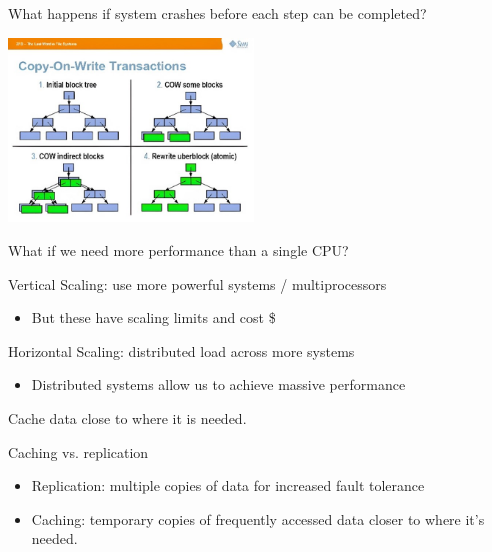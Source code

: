 \begin{slide}

    
    What happens if system crashes before each step can be completed?
    \bigskip

    \includegraphics[width=65mm]{zfs.jpg}

\end{slide}

\begin{slide}

	
	What if we need more performance than a single CPU?
	\bigskip
	
	Vertical Scaling: use more powerful systems / multiprocessors
	\begin{itemize}
		\item But these have scaling limits and cost \$
	\end{itemize}
	\bigskip
	
	Horizontal Scaling: distributed load across more systems
	\begin{itemize}
		\item Distributed systems allow us to achieve massive performance
	\end{itemize}

\end{slide}

\begin{slide}
	
	
	Cache data close to where it is needed.
	\bigskip
	
	Caching vs. replication
	\begin{itemize}
		\item Replication: multiple copies of data for increased fault tolerance
		\item Caching: temporary copies of frequently accessed data closer to where it’s needed.
	\end{itemize}
	
\end{slide}

